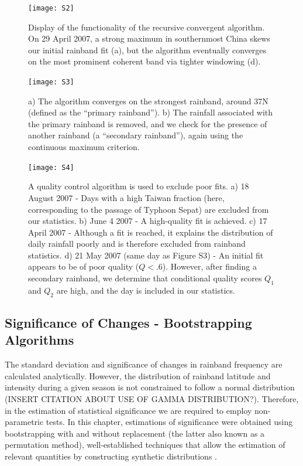 \begin{figure}

\noindent\texttt{[image: S2]}
\caption{Display of the functionality of the recursive convergent algorithm. On 29 April 2007, a strong maximum in southernmost China skews our initial rainband fit (a), but the algorithm eventually converges on the most prominent coherent band via tighter windowing (d).}
\label{f52}
\end{figure}

\begin{figure}

\noindent\texttt{[image: S3]}
\caption{a) The algorithm converges on the strongest rainband, around 37N (defined as the ``primary rainband''). b) The rainfall associated with the primary rainband is removed, and we check for the presence of another rainband (a ``secondary rainband''), again using the continuous maximum criterion.}
\label{f53}
\end{figure}

\begin{figure}

\noindent\texttt{[image: S4]}
\caption{A quality control algorithm is used to exclude poor fits. a) 18 August 2007 - Days with a high Taiwan fraction (here, corresponding to the passage of Typhoon Sepat) are excluded from our statistics. b) June 4 2007 - A high-quality fit is achieved. c) 17 April 2007 - Although a fit is reached, it explains the distribution of daily rainfall poorly and is therefore excluded from rainband statistics. d) 21 May 2007 (same day as Figure S3) - An initial fit appears to be of poor quality ($Q<.6$). However, after finding a secondary rainband, we determine that conditional quality scores $Q_1$ and $Q_2$ are high, and the day is included in our statistics.}
\label{f54}
\end{figure}


\subsection{Significance of Changes - Bootstrapping Algorithms}

	The standard deviation and significance of changes in rainband frequency are calculated analytically. However, the distribution of rainband latitude and intensity during a given season is not constrained to follow a normal distribution (INSERT CITATION ABOUT USE OF GAMMA DISTRIBUTION?). Therefore, in the estimation of statistical significance we are required to employ non-parametric tests. In this chapter, estimations of significance were obtained using bootstrapping with and without replacement (the latter also known as a permutation method), well-established techniques that allow the estimation of relevant quantities by constructing synthetic distributions \citep{Good2005}.
	
